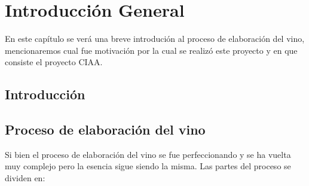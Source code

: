 
\chapter{Introducción General} %

\label{Chapter1} %
\label{IntroGeneral}

En este capítulo se verá una breve introdución al proceso de elaboración del vino, mencionaremos cual fue motivación por la cual se realizó este proyecto y en que consiste el proyecto CIAA. 


\newcommand{\keyword}[1]{\textbf{#1}}
\newcommand{\tabhead}[1]{\textbf{#1}}
\newcommand{\code}[1]{\texttt{#1}}
\newcommand{\file}[1]{\texttt{\bfseries#1}}
\newcommand{\option}[1]{\texttt{\itshape#1}}
\newcommand{\grados}{$^{\circ}$}


\section{Introducción}


\section{Proceso de elaboración del vino}
Si bien el proceso de elaboración del vino se fue perfeccionando y se ha vuelta muy complejo pero la esencia sigue siendo la misma.
Las partes del proceso se dividen en:

